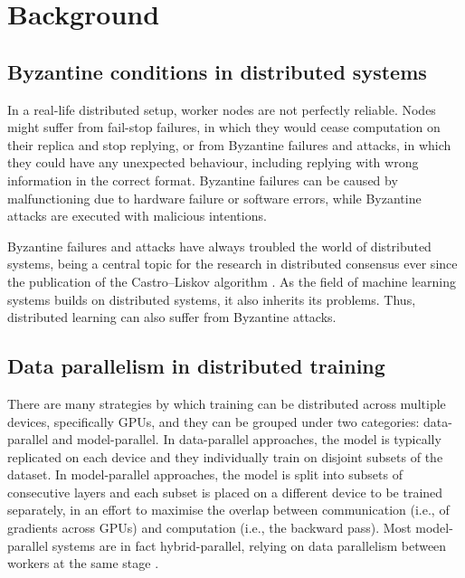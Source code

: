 \documentclass{article}
\begin{document}
\section{Background}

\subsection{Byzantine conditions in distributed systems}
In a real-life distributed setup, worker nodes are not perfectly reliable. Nodes might suffer from fail-stop failures, in which they would cease computation on their replica and stop replying, or from Byzantine failures and attacks, in which they could have any unexpected behaviour, including replying with wrong information in the correct format. Byzantine failures can be caused by malfunctioning due to hardware failure or software errors, while Byzantine attacks are executed with malicious intentions.

Byzantine failures and attacks have always troubled the world of distributed systems, being a central topic for the research in distributed consensus ever since the publication of the Castro--Liskov algorithm \citep{castro1999practical}. As the field of machine learning systems builds on distributed systems, it also inherits its problems. Thus, distributed learning can also suffer from Byzantine attacks.


\subsection{Data parallelism in distributed training}
There are many strategies by which training can be distributed across multiple devices, specifically GPUs, and they can be grouped under two categories: data-parallel and model-parallel. In data-parallel approaches, the model is typically replicated on each device and they individually train on disjoint subsets of the dataset. In model-parallel approaches, the model is split into subsets of consecutive layers and each subset is placed on a different device to be trained separately, in an effort to maximise the overlap between communication (i.e., of gradients across GPUs) and computation (i.e., the backward pass). Most model-parallel systems are in fact hybrid-parallel, relying on data parallelism between workers at the same stage \citep{rajbhandari2020zero, narayanan2021efficient}.
\end{document}
